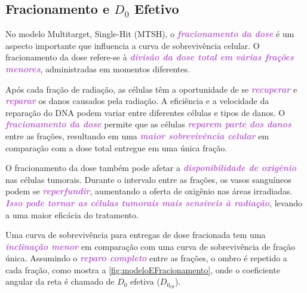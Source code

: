\documentclass[11pt,a4paper]{article}
\begin{document}
\subsection*{Fracionamento e $D_0$ Efetivo}

	No modelo Multitarget, Single-Hit (MTSH), o \textcolor{MediumOrchid}{\textbf{\textit{fracionamento da dose}}} é um aspecto importante que influencia a curva de sobrevivência celular. O fracionamento da dose refere-se à \textcolor{MediumOrchid}{\textbf{\textit{divisão da dose total em várias frações menores}}}, administradas em momentos diferentes. 

	Após cada fração de radiação, as células têm a oportunidade de se \textcolor{MediumOrchid}{\textbf{\textit{recuperar}}} e \textcolor{MediumOrchid}{\textbf{\textit{reparar}}} os danos causados pela radiação. A eficiência e a velocidade da reparação do DNA podem variar entre diferentes células e tipos de danos. O \textcolor{MediumOrchid}{\textbf{\textit{fracionamento da dose}}} permite que as células \textcolor{MediumOrchid}{\textbf{\textit{reparem parte dos danos}}} entre as frações, resultando em uma \textcolor{MediumOrchid}{\textbf{\textit{maior sobrevivência celular}}} em comparação com a dose total entregue em uma única fração.

	O fracionamento da dose também pode afetar a \textcolor{MediumOrchid}{\textbf{\textit{disponibilidade de oxigênio}}} nas células tumorais. Durante o intervalo entre as frações, os vasos sanguíneos podem se \textcolor{MediumOrchid}{\textbf{\textit{reperfundir}}}, aumentando a oferta de oxigênio nas áreas irradiadas. \textcolor{MediumOrchid}{\textbf{\textit{Isso pode tornar as células tumorais mais sensíveis à radiação}}}, levando a uma maior eficácia do tratamento.

	Uma curva de sobrevivência para entregas de dose fracionada tem uma \textcolor{MediumOrchid}{\textbf{\textit{inclinação menor}}} em comparação com uma curva de sobrevivência de fração única. Assumindo o \textcolor{MediumOrchid}{\textbf{\textit{reparo completo}}} entre as frações, o ombro é repetido a cada fração, como mostra a \ref{fig:modeloEFracionamento}, onde o coeficiente angular da reta é chamado de $D_0$ efetiva ($D_{0_{\text{eff}}}$).
\end{document}
